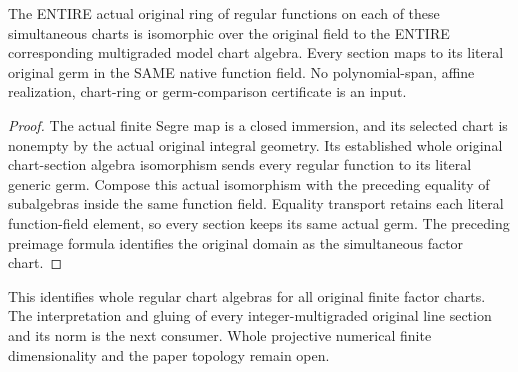 \begin{theorem}\label{thm:actual-original-family-whole-chart-sections}
\leanok
{}
The ENTIRE actual original ring of regular functions on each of these simultaneous charts is isomorphic over the original field to the ENTIRE corresponding multigraded model chart algebra. Every section maps to its literal original germ in the SAME native function field. No polynomial-span, affine realization, chart-ring or germ-comparison certificate is an input.
\end{theorem}
\begin{proof}
The actual finite Segre map is a closed immersion, and its selected chart is nonempty by the actual original integral geometry. Its established whole original chart-section algebra isomorphism sends every regular function to its literal generic germ. Compose this actual isomorphism with the preceding equality of subalgebras inside the same function field. Equality transport retains each literal function-field element, so every section keeps its same actual germ. The preceding preimage formula identifies the original domain as the simultaneous factor chart.
\end{proof}
This identifies whole regular chart algebras for all original finite factor charts. The interpretation and gluing of every integer-multigraded original line section and its norm is the next consumer. Whole projective numerical finite dimensionality and the paper topology remain open.
